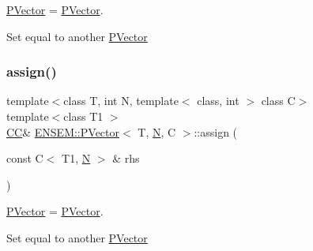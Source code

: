 \mbox{\hyperlink{classENSEM_1_1PVector}{P\+Vector}} = \mbox{\hyperlink{classENSEM_1_1PVector}{P\+Vector}}. 

Set equal to another \mbox{\hyperlink{classENSEM_1_1PVector}{P\+Vector}} \mbox{\label{classENSEM_1_1PVector_ab908e56421fdbff29813fb8bdaecdb6f}} 
\subsubsection{\texorpdfstring{assign()}{assign()}\hspace{0.1cm}{\footnotesize\ttfamily [5/6]}}
{\footnotesize\ttfamily template$<$class T, int N, template$<$ class, int $>$ class C$>$ \\
template$<$class T1 $>$ \\
\mbox{\hyperlink{classENSEM_1_1PVector_a92dc0a0a301a3dc96f7be5d337019bc7}{CC}}\& \mbox{\hyperlink{classENSEM_1_1PVector}{E\+N\+S\+E\+M\+::\+P\+Vector}}$<$ T, \mbox{\hyperlink{adat__devel_2lib_2hadron_2operator__name__util_8cc_a7722c8ecbb62d99aee7ce68b1752f337}{N}}, C $>$\+::assign (\begin{DoxyParamCaption}\item[{const C$<$ T1, \mbox{\hyperlink{adat__devel_2lib_2hadron_2operator__name__util_8cc_a7722c8ecbb62d99aee7ce68b1752f337}{N}} $>$ \&}]{rhs }\end{DoxyParamCaption})\hspace{0.3cm}{\ttfamily [inline]}}



\mbox{\hyperlink{classENSEM_1_1PVector}{P\+Vector}} = \mbox{\hyperlink{classENSEM_1_1PVector}{P\+Vector}}. 

Set equal to another \mbox{\hyperlink{classENSEM_1_1PVector}{P\+Vector}} \mbox{\label{classENSEM_1_1PVector_ab908e56421fdbff29813fb8bdaecdb6f}} 
